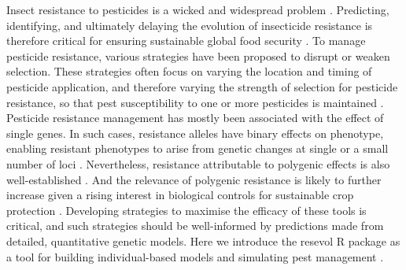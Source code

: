 \documentclass[
]{article}
\begin{document}
Insect resistance to pesticides is a wicked and widespread problem \citep{Gould2018}.
Predicting, identifying, and ultimately delaying the evolution of insecticide resistance is therefore critical for ensuring sustainable global food security \citep{Hawkins2019, Lykogianni2021}.
To manage pesticide resistance, various strategies have been proposed to disrupt or weaken selection.
These strategies often focus on varying the location and timing of pesticide application, and therefore varying the strength of selection for pesticide resistance, so that pest susceptibility to one or more pesticides is maintained \citep{Ives2002, Liang2013, Carriere2016, Liang2018, South2018, Sudo2018, Saikai2021}.
Pesticide resistance management has mostly been associated with the effect of single genes.
In such cases, resistance alleles have binary effects on phenotype, enabling resistant phenotypes to arise from genetic changes at single or a small number of loci \citep{Raymond2001, Ffrench-Constant2004, Ffrench-Constant2013}.
Nevertheless, resistance attributable to polygenic effects is also well-established \citep{Via1986, Firko1990, Busi2013, Haridas2018, Green2020, Mangan2023}.
And the relevance of polygenic resistance is likely to further increase given a rising interest in biological controls for sustainable crop protection \citep[e.g.,][]{Green2020, Elnahal2022, Mangan2023}.
Developing strategies to maximise the efficacy of these tools is critical, and such strategies should be well-informed by predictions made from detailed, quantitative genetic models.
Here we introduce the resevol R package as a tool for building individual-based models and simulating pest management \citep{Daly2022}.
\end{document}
